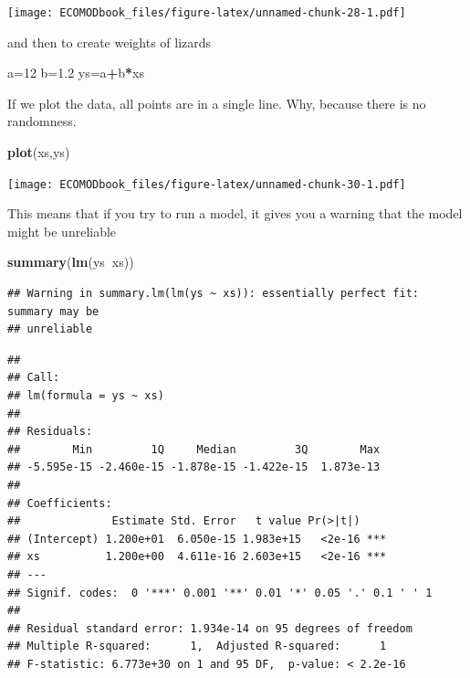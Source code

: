 \documentclass[
]{book}
\newenvironment{Shaded}{\begin{snugshade}}{\end{snugshade}}
\newcommand{\DecValTok}[1]{\textcolor[rgb]{0.00,0.00,0.81}{#1}}
\newcommand{\FloatTok}[1]{\textcolor[rgb]{0.00,0.00,0.81}{#1}}
\newcommand{\KeywordTok}[1]{\textcolor[rgb]{0.13,0.29,0.53}{\textbf{#1}}}
\newcommand{\NormalTok}[1]{#1}
\newcommand{\OperatorTok}[1]{\textcolor[rgb]{0.81,0.36,0.00}{\textbf{#1}}}
\begin{document}
\texttt{[image: ECOMODbook\_files/figure-latex/unnamed-chunk-28-1.pdf]}

and then to create weights of lizards

\begin{Shaded}
\begin{Highlighting}[]
\NormalTok{a=}\DecValTok{12}
\NormalTok{b=}\FloatTok{1.2}
\NormalTok{ys=a}\OperatorTok{+}\NormalTok{b}\OperatorTok{*}\NormalTok{xs}
\end{Highlighting}
\end{Shaded}

If we plot the data, all points are in a single line. Why, because there is no randomness.

\begin{Shaded}
\begin{Highlighting}[]
\KeywordTok{plot}\NormalTok{(xs,ys)}
\end{Highlighting}
\end{Shaded}

\texttt{[image: ECOMODbook\_files/figure-latex/unnamed-chunk-30-1.pdf]}

This means that if you try to run a model, it gives you a warning that the model might be unreliable

\begin{Shaded}
\begin{Highlighting}[]
\KeywordTok{summary}\NormalTok{(}\KeywordTok{lm}\NormalTok{(ys}\OperatorTok{~}\NormalTok{xs))}
\end{Highlighting}
\end{Shaded}

\begin{verbatim}
## Warning in summary.lm(lm(ys ~ xs)): essentially perfect fit: summary may be
## unreliable
\end{verbatim}

\begin{verbatim}
## 
## Call:
## lm(formula = ys ~ xs)
## 
## Residuals:
##        Min         1Q     Median         3Q        Max 
## -5.595e-15 -2.460e-15 -1.878e-15 -1.422e-15  1.873e-13 
## 
## Coefficients:
##              Estimate Std. Error   t value Pr(>|t|)    
## (Intercept) 1.200e+01  6.050e-15 1.983e+15   <2e-16 ***
## xs          1.200e+00  4.611e-16 2.603e+15   <2e-16 ***
## ---
## Signif. codes:  0 '***' 0.001 '**' 0.01 '*' 0.05 '.' 0.1 ' ' 1
## 
## Residual standard error: 1.934e-14 on 95 degrees of freedom
## Multiple R-squared:      1,	Adjusted R-squared:      1 
## F-statistic: 6.773e+30 on 1 and 95 DF,  p-value: < 2.2e-16
\end{verbatim}
\end{document}
